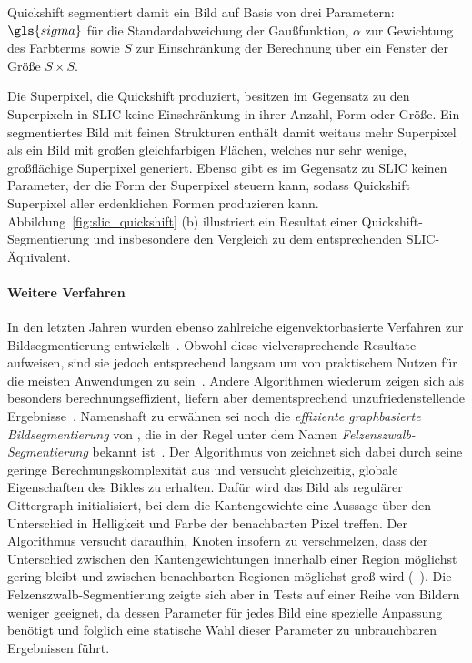 Quickshift segmentiert damit ein Bild auf Basis von drei Parametern: $\gls{sigma}$ für die  Standardabweichung der Gaußfunktion, $\alpha$ zur Gewichtung des Farbterms sowie $S$ zur Einschränkung der Berechnung über ein Fenster der Größe $S \times S$.

Die Superpixel, die Quickshift produziert, besitzen im Gegensatz zu den Superpixeln in \gls{SLIC} keine Einschränkung in ihrer Anzahl, Form oder Größe.
Ein segmentiertes Bild mit feinen Strukturen enthält damit weitaus mehr Superpixel als ein Bild mit großen gleichfarbigen Flächen, welches nur sehr wenige, großflächige Superpixel generiert.
Ebenso gibt es im Gegensatz zu \gls{SLIC} keinen Parameter, der die Form der Superpixel steuern kann, sodass Quickshift Superpixel aller erdenklichen Formen produzieren kann.
Abbildung~\ref{fig:slic_quickshift} (b) illustriert ein Resultat einer Quickshift-Segmentierung und insbesondere den Vergleich zu dem entsprechenden \gls{SLIC}-Äquivalent.

\paragraph{Weitere Verfahren}
\label{weitere_superpixel_verfahren}

In den letzten Jahren wurden ebenso zahlreiche eigenvektorbasierte Verfahren zur Bildsegmentierung entwickelt~\cite{super, felzenszwalb}.
Obwohl diese vielversprechende Resultate aufweisen, sind sie jedoch entsprechend langsam um von praktischem Nutzen für die meisten Anwendungen zu sein~\cite{felzenszwalb}.
Andere Algorithmen wiederum zeigen sich als besonders berechnungseffizient, liefern aber dementsprechend unzufriedenstellende Ergebnisse~\cite{felzenszwalb}.
Namenshaft zu erwähnen sei noch die \emph{effiziente graphbasierte Bildsegmentierung} von \citeauthor{felzenszwalb}, die in der Regel unter dem Namen \emph{Felzenszwalb-Segmentierung} bekannt ist~\cite{felzenszwalb}.
Der Algorithmus von \citeauthor{felzenszwalb} zeichnet sich dabei durch seine geringe Berechnungskomplexität aus und versucht gleichzeitig, globale Eigenschaften des Bildes zu erhalten.
Dafür wird das Bild als regulärer Gittergraph initialisiert, bei dem die Kantengewichte eine Aussage über den Unterschied in Helligkeit und Farbe der benachbarten Pixel treffen.
Der Algorithmus versucht daraufhin, Knoten insofern zu verschmelzen, dass der Unterschied zwischen den Kantengewichtungen innerhalb einer Region möglichst gering bleibt und zwischen benachbarten Regionen möglichst groß wird (\vgl{}~\cite{felzenszwalb}).
Die Felzenszwalb-Segmentierung zeigte sich aber in Tests auf einer Reihe von Bildern weniger geeignet, da dessen Parameter für jedes Bild eine spezielle Anpassung benötigt und folglich eine statische Wahl dieser Parameter zu unbrauchbaren Ergebnissen führt.
